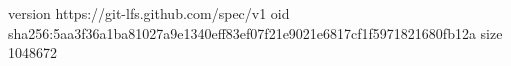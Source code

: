 version https://git-lfs.github.com/spec/v1
oid sha256:5aa3f36a1ba81027a9e1340eff83ef07f21e9021e6817cf1f5971821680fb12a
size 1048672
